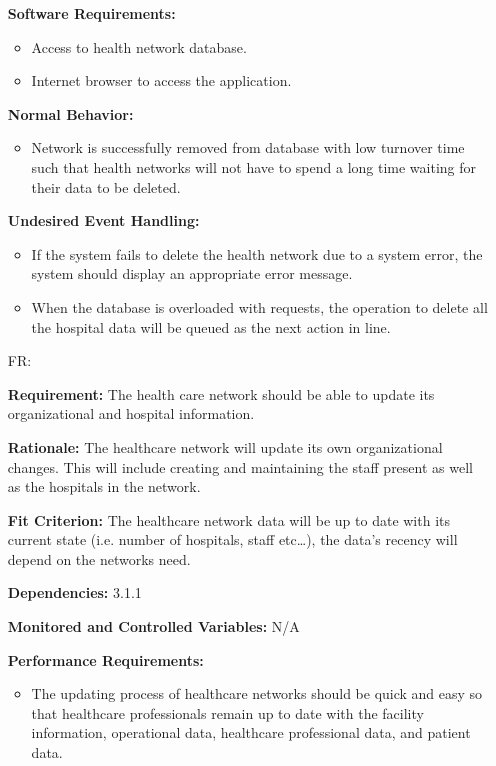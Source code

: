 \documentclass[12pt]{article}
\newcounter{reqnum} %
\begin{document}
\begin{itemize}
\textbf{Software Requirements:}
\begin{itemize}
  \item Access to health network database.
  \item Internet browser to access the application.
\end{itemize}

\textbf{Normal Behavior:}
\begin{itemize}
  \item Network is successfully removed from database with low turnover time such that health networks will not have to spend a long time waiting for their data to be deleted.
\end{itemize}

\textbf{Undesired Event Handling:}
\begin{itemize}
  \item If the system fails to delete the health network due to a system error, the system should display an appropriate error message. 
  \item When the database is overloaded with requests, the operation to delete all the hospital data will be queued as the next action in line.
\end{itemize}


\item[FR\refstepcounter{reqnum}\thereqnum \label{FR_UpdateHealthNetwork}:]

\textbf{Requirement:} The health care network should be able to update its organizational and hospital information.

\textbf{Rationale:} The healthcare network will update its own organizational changes. This will include creating and maintaining the staff present as well as the hospitals in the network.

\textbf{Fit Criterion:} The healthcare network data will be up to date with its current state (i.e. number of hospitals, staff etc…), the data’s recency will depend on the networks need. 

\textbf{Dependencies:} 3.1.1 

\textbf{Monitored and Controlled Variables:} N/A

\textbf{Performance Requirements:} 
\begin{itemize}
  \item The updating process of healthcare networks should be quick and easy so that healthcare professionals remain up to date with the facility information, operational data, healthcare professional data, and patient data.
\end{itemize}


\end{itemize}
\end{document}
